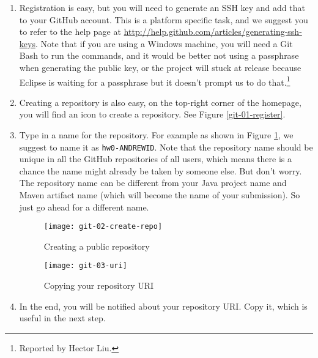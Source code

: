 \begin{enumerate}
\item Registration is easy, but you will need to generate an SSH key and add that to your GitHub account. This is a platform specific task, and we suggest you to refer to the help page at \url{http://help.github.com/articles/generating-ssh-keys}. Note that if you are using a Windows machine, you will need a Git Bash to run the commands, and it would be better not using a passphrase when generating the public key, or the project will stuck at release because Eclipse is waiting for a passphrase but it doesn't prompt us to do that.\footnote{Reported by Hector Liu.}


\item Creating a repository is also easy, on the top-right corner of the homepage, you will find an icon to create a repository. See Figure \ref{git-01-register}.

\item Type in a name for the repository. For example as shown in Figure \ref{git-02-create-repo}, we suggest to name it as \texttt{hw0-ANDREWID}. Note that the repository name should be unique in all the GitHub repositories of all users, which means there is a chance the name might already be taken by someone else. But don't worry. The repository name can be different from your Java project name and Maven artifact name (which will become the name of your submission). So just go ahead for a different name.

\begin{figure}[t]
\centering
\texttt{[image: git-02-create-repo]}
\caption{Creating a public repository\label{git-02-create-repo}}
\end{figure}

\begin{figure}[t]
\centering
\texttt{[image: git-03-uri]}
\caption{Copying your repository URI\label{git-03-uri}}
\end{figure}

\item In the end, you will be notified about your repository URI. Copy it, which is useful in the next step.

\end{enumerate}

